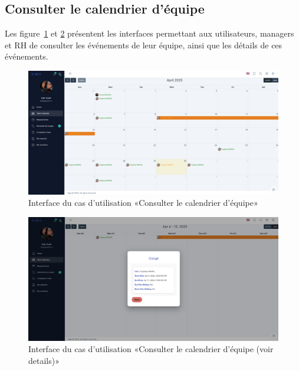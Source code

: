 \subsection{Consulter le calendrier d’équipe}
Les figure~\ref{fig:team_calendar} et \ref{fig:team_calendar1} présentent les interfaces permettant aux utilisateurs, managers et RH de consulter les événements de leur équipe, ainsi que les détails de ces événements. \\
\begin{figure}[h]
    \centering
    \includegraphics[width=15cm]{images/realisation/team_calendar.png}
    \caption{Interface du cas d'utilisation «Consulter le calendrier d’équipe»}
    \label{fig:team_calendar}
\end{figure}
\begin{figure}[h]
    \centering
    \includegraphics[width=15cm]{images/realisation/team_calendar2.png}
    \caption{Interface du cas d'utilisation «Consulter le calendrier d’équipe (voir details)»}
    \label{fig:team_calendar1}
\end{figure}
\clearpage
